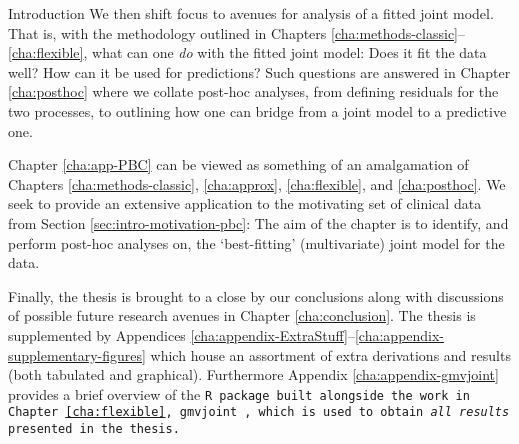 \begin{chapter}{\label{cha:intro}Introduction}
  We then shift focus to avenues for analysis of a fitted joint model. That is, with the methodology outlined in Chapters \ref{cha:methods-classic}--\ref{cha:flexible}, what can one \textit{do} with the fitted joint model: Does it fit the data well? How can it be used for predictions? Such questions are answered in Chapter \ref{cha:posthoc} where we collate post-hoc analyses, from defining residuals for the two processes, to outlining how one can bridge from a joint model to a predictive one.

  Chapter \ref{cha:app-PBC} can be viewed as something of an amalgamation of Chapters \ref{cha:methods-classic}, \ref{cha:approx}, \ref{cha:flexible}, and \ref{cha:posthoc}. We seek to provide an extensive application to the motivating set of clinical data from Section \ref{sec:intro-motivation-pbc}: The aim of the chapter is to identify, and perform post-hoc analyses on, the `best-fitting' (multivariate) joint model for the data.  

  Finally, the thesis is brought to a close by our conclusions along with discussions of possible future research avenues in Chapter \ref{cha:conclusion}. The thesis is supplemented by Appendices \ref{cha:appendix-ExtraStuff}--\ref{cha:appendix-supplementary-figures} which house an assortment of extra derivations and results (both tabulated and graphical). Furthermore Appendix \ref{cha:appendix-gmvjoint} provides a brief overview of the \tt{R} package built alongside the work in Chapter \ref{cha:flexible}, \tt{gmvjoint} \citep{Murray2023}, which is used to obtain \textit{all results} presented in the thesis.
\end{chapter}